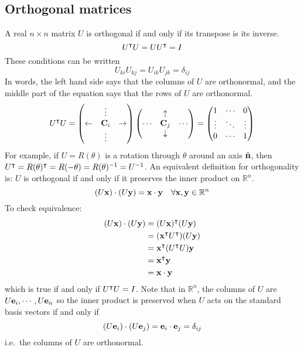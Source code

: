 \subsection{Orthogonal matrices}
A real \(n \times n\) matrix \(U\) is orthogonal if and only if its transpose is its inverse.
\[
	U^\intercal U = UU^\intercal = I
\]
These conditions can be written
\[
	U_{ki}U_{kj} = U_{ik}U_{jk} = \delta_{ij}
\]
In words, the left hand side says that the columns of \(U\) are orthonormal, and the middle part of the equation says that the rows of \(U\) are orthonormal.
\[
	U^\intercal U = \begin{pmatrix}
		           & \vdots  &             \\
		\leftarrow & \vb C_i & \rightarrow \\
		           & \vdots  &
	\end{pmatrix}
	\begin{pmatrix}
		       & \uparrow   &        \\
		\cdots & \vb C_j    & \cdots \\
		       & \downarrow &
	\end{pmatrix}
	= \begin{pmatrix}
		1      & \cdots & 0      \\
		\vdots & \ddots & \vdots \\
		0      & \cdots & 1
	\end{pmatrix}
\]
For example, if \(U = R(\theta)\) is a rotation through \(\theta\) around an axis \(\hat{\vb{n}}\), then \(U^\intercal = R(\theta)^\intercal = R(-\theta) = R(\theta)^{-1} = U^{-1}\).
An equivalent definition for orthogonality is: \(U\) is orthogonal if and only if it preserves the inner product on \(\mathbb R^n\).
\[
	(U\vb x)\cdot(U \vb y) = \vb x \cdot \vb y\quad \forall \vb x, \vb y \in \mathbb R^n
\]
To check equivalence:
\begin{align*}
	(U\vb x)\cdot(U \vb y) & = (U\vb x)^\intercal (U\vb y)             \\
	                       & = (\vb x^\intercal U^\intercal) (U\vb y) \\
	                       & = \vb x^\intercal (U^\intercal U) \vb y  \\
	                       & = \vb x^\intercal \vb y                   \\
	                       & = \vb x \cdot \vb y
\end{align*}
which is true if and only if \(U^\intercal U = I\).
Note that in \(\mathbb R^n\), the columns of \(U\) are \(U\vb e_i, \cdots, U\vb e_n\) so the inner product is preserved when \(U\) acts on the standard basis vectors if and only if
\[
	(U\vb e_i)\cdot(U\vb e_j) = \vb e_i \cdot \vb e_j = \delta_{ij}
\]
i.e.\ the columns of \(U\) are orthonormal.

